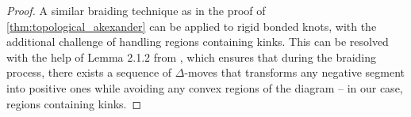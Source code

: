 \documentclass{article}
\theoremstyle{definition}
\theoremstyle{plain}
\theoremstyle{remark}
\begin{document}
\begin{proof} %
A similar braiding technique as in the proof of \autoref{thm:topological_akexander} can be applied to rigid bonded knots, with the additional challenge of handling regions containing kinks. This  can be resolved with the help of Lemma 2.1.2 from \cite{birman1974braids}, which ensures that during the braiding process, there exists a sequence of $\Delta$-moves that transforms any negative segment into positive ones while avoiding any convex regions of the diagram -- in our case, regions containing kinks.







\end{proof}
\end{document}
